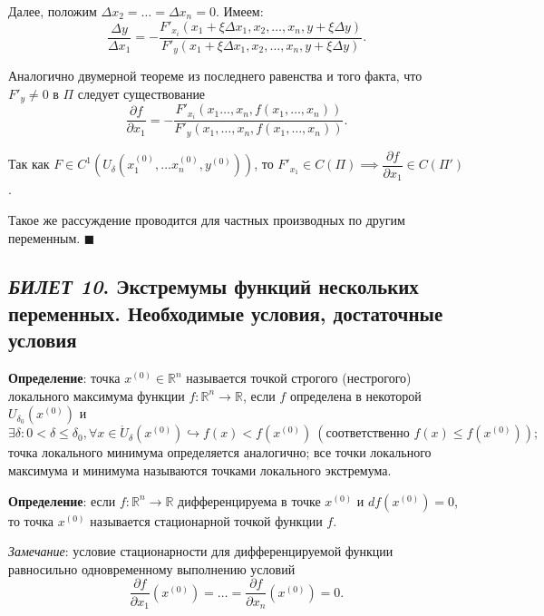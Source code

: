 \documentclass[12pt, a4paper, reqno]{article}
\begin{document}
    Далее, положим $\Delta x_2 = \ldots = \Delta x_n = 0$. Имеем:
    \begin{equation*}
        \frac{\Delta y}{\Delta x_1} = -\frac{F'_{x_i}(x_1 + \xi\Delta x_1, x_2, \ldots, x_n, y + \xi\Delta y)}
                                            {F'_y(x_1 + \xi\Delta x_1, x_2, \ldots, x_n, y + \xi\Delta y)}.
    \end{equation*}

    Аналогично двумерной теореме из последнего равенства и того факта, что $F'_y \neq 0$ в $\Pi$
    следует существование
    \begin{equation*}
        \dfrac{\partial f}{\partial x_1} = -\frac{F'_{x_i}(x_1 \ldots, x_n, f(x_1, \ldots, x_n))}
                                                 {F'_y(x_1, \ldots, x_n, f(x_1, \ldots, x_n))}.
    \end{equation*}

    Так как $F \in C^1(U_{\delta}(x_1^{(0)}, \ldots x_n^{(0)}, y^{(0)}))$, то $F'_{x_1} \in C(\Pi)
    \implies \dfrac{\partial f}{\partial x_1} \in C(\Pi')$.

    Такое же рассуждение проводится для частных производных по другим переменным.
    $\blacksquare$

\newpage
\subsection{\textit{БИЛЕТ 10}. Экстремумы функций нескольких переменных. Необходимые условия,
            достаточные условия}

    \textbf{Определение}: точка $x^{(0)} \in \mathbb{R}^n$ называется точкой строгого (нестрогого)
    локального максимума функции $f: \mathbb{R}^n \to \mathbb{R}$, если $f$ определена в некоторой
    $U_{\delta_0}(x^{(0)})$ и
    \begin{equation*}
        \exists \delta: 0 < \delta \leq \delta_0, \forall x \in \mathring U_{\delta}(x^{(0)})
        \hookrightarrow f(x) < f(x^{(0)})\ (\text{соответственно }f(x) \leq f(x^{(0)}));
    \end{equation*}
    точка локального минимума определяется аналогично; все точки локального максимума и минимума
    называются точками локального экстремума.

    \textbf{Определение}: если $f: \mathbb{R}^n \to \mathbb{R}$ дифференцируема в точке $x^{(0)}$
    и $df(x^{(0)}) = 0$, то точка $x^{(0)}$ называется стационарной точкой функции $f$.

    \textit{Замечание}: условие стационарности для дифференцируемой функции равносильно одновременному
    выполнению условий
    \begin{equation*}
        \frac{\partial f}{\partial x_1}(x^{(0)}) = \ldots = \frac{\partial f}{\partial x_n}(x^{(0)}) = 0.
    \end{equation*}
\end{document}
